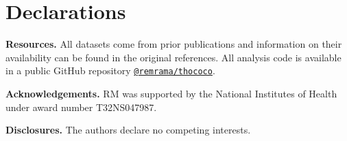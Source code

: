 \documentclass[10pt,a4paper,twocolumn]{article}
\begin{document}

\section*{Declarations}

\textbf{Resources.} All datasets come from prior publications and information on their availability can be found in the original references. All analysis code is available in a public GitHub repository \href{https://github.com/remrama/thococo}{\texttt{@remrama/thococo}}.

\textbf{Acknowledgements.} RM was supported by the National Institutes of Health under award number T32NS047987.

\textbf{Disclosures.} The authors declare no competing interests.

\printbibliography

\end{document}
